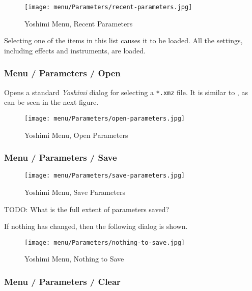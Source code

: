 \begin{figure}[H]
   \centering 
   \texttt{[image: menu/Parameters/recent-parameters.jpg]}
   \caption{Yoshimi Menu, Recent Parameters}
   \label{fig:yoshimi_menu_recent_parameters}
\end{figure}

   Selecting one of the items in this list causes it to be loaded.
   All the settings, including effects and instruments, are loaded.

\subsubsection{Menu / Parameters / Open}
\label{subsubsec:menu_parameters_open}

   Opens a standard \textsl{Yoshimi} dialog for selecting a
   \texttt{*.xmz} file.
   It is similar to
   ,
   as can be seen in the next figure.

\begin{figure}[H]
   \centering 
   \texttt{[image: menu/Parameters/open-parameters.jpg]}
   \caption{Yoshimi Menu, Open Parameters}
   \label{fig:yoshimi_menu_open_parameters}
\end{figure}

\subsubsection{Menu / Parameters / Save}
\label{subsubsec:menu_parameters_save}

\begin{figure}[H]
   \centering 
   \texttt{[image: menu/Parameters/save-parameters.jpg]}
   \caption{Yoshimi Menu, Save Parameters}
   \label{fig:yoshimi_menu_save_parameters}
\end{figure}

   TODO:  What is the full extent of parameters saved?

   If nothing has changed, then the following dialog is shown.

\begin{figure}[H]
   \centering 
   \texttt{[image: menu/Parameters/nothing-to-save.jpg]}
   \caption{Yoshimi Menu, Nothing to Save}
   \label{fig:yoshimi_menu_nothing_to_save_parameters}
\end{figure}

\subsubsection{Menu / Parameters / Clear}
\label{subsubsec:menu_parameters_clear}

